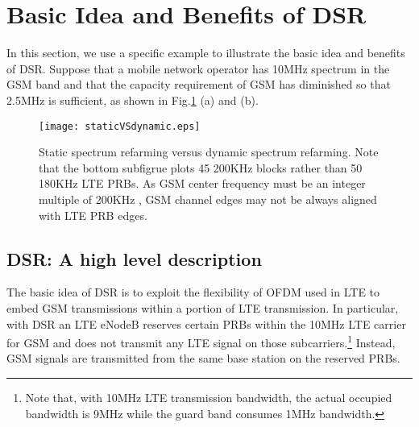 \documentclass[10pt,journal]{IEEEtran}
\theoremstyle{slplain}
\begin{document}
\section{Basic Idea and Benefits of DSR}
\label{sec:basic}


In this section, we use a specific example to illustrate the basic idea and benefits of DSR. Suppose that a mobile network operator has 10MHz spectrum in the GSM band and that the capacity requirement of GSM has diminished so that 2.5MHz is sufficient, as shown in Fig.\ref{fig:staticVSdynamic} (a) and (b).

 \begin{figure}
 \centering
 \texttt{[image: staticVSdynamic.eps]}
 \caption{Static spectrum refarming versus dynamic spectrum refarming. Note that the bottom subfigrue plots 45 200KHz blocks rather than 50 180KHz LTE PRBs. As GSM center frequency must be an integer multiple of 200KHz \cite{ETSIgsm}, GSM channel edges may not be always aligned with LTE PRB edges.}
 \label{fig:staticVSdynamic}
 \end{figure}

\subsection{DSR: A high level description}

The basic idea of DSR is to exploit the flexibility of OFDM used in LTE to embed GSM transmissions within a portion of LTE transmission. In particular, with DSR an LTE eNodeB reserves certain PRBs within the 10MHz LTE carrier for GSM and does not transmit any LTE signal on those subcarriers.\footnote{Note that, with 10MHz LTE transmission bandwidth, the actual occupied bandwidth is 9MHz while the guard band consumes 1MHz bandwidth.} Instead, GSM signals are transmitted from the same base station on the reserved PRBs.
\end{document}
